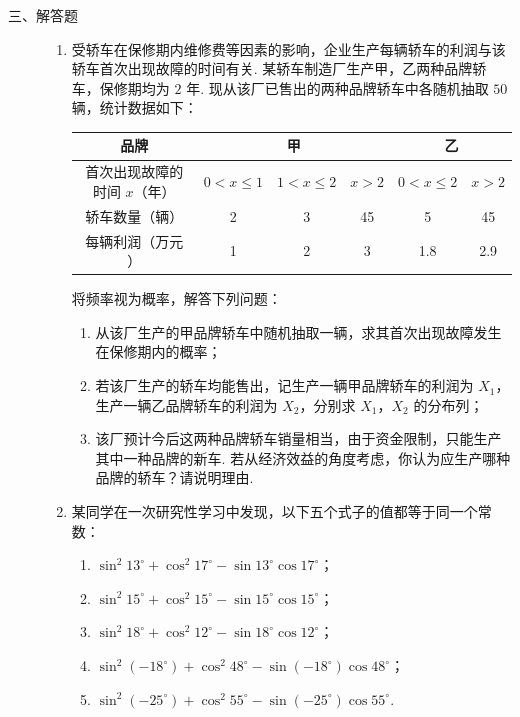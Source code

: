 \begin{description}

    \item[三、解答题]

    \begin{enumerate}[leftmargin=5pt]

      \addtocounter{enumi}{+15}

        \item 受轿车在保修期内维修费等因素的影响，企业生产每辆轿车的利润与该轿车首次出现故障的时间有关. 某轿车制造厂生产甲，乙两种品牌轿车，保修期均为 \(2\) 年. 现从该厂已售出的两种品牌轿车中各随机抽取 \(50\) 辆，统计数据如下：

\begin{center}
\renewcommand{\arraystretch}{1.2}
\begin{tabular}{|c|c|c|c|c|c|}
\hline
品牌 & \multicolumn{3}{c|}{甲} & \multicolumn{2}{c|}{乙} \\
\hline
首次出现故障的时间 \(x\)（\(\text{年}\)） & \(0 < x \leqslant 1\) & \(1 < x \leqslant 2\) & \(x > 2\) & \(0 < x \leqslant 2\) & \(x > 2\) \\
\hline
轿车数量（\(\text{辆}\)） & 2 & 3 & 45 & 5 & 45 \\
\hline
每辆利润（\(\text{万元}\)） & 1 & 2 & 3 & 1.8 & 2.9 \\
\hline
\end{tabular}
\end{center}

将频率视为概率，解答下列问题：

\begin{enumerate}
\item 从该厂生产的甲品牌轿车中随机抽取一辆，求其首次出现故障发生在保修期内的概率；
\item 若该厂生产的轿车均能售出，记生产一辆甲品牌轿车的利润为 \(X_{1}\)，生产一辆乙品牌轿车的利润为 \(X_{2}\)，分别求 \(X_{1}\)，\(X_{2}\) 的分布列；
\item 该厂预计今后这两种品牌轿车销量相当，由于资金限制，只能生产其中一种品牌的新车. 若从经济效益的角度考虑，你认为应生产哪种品牌的轿车？请说明理由.
\end{enumerate}

        \item 某同学在一次研究性学习中发现，以下五个式子的值都等于同一个常数：

\begin{enumerate}
\item \(\sin^{2}13^{\circ} + \cos^{2}17^{\circ} - \sin13^{\circ}\cos17^{\circ}\)；
\item \(\sin^{2}15^{\circ} + \cos^{2}15^{\circ} - \sin15^{\circ}\cos15^{\circ}\)；
\item \(\sin^{2}18^{\circ} + \cos^{2}12^{\circ} - \sin18^{\circ}\cos12^{\circ}\)；
\item \(\sin^{2}(-18^{\circ}) + \cos^{2}48^{\circ} - \sin(-18^{\circ})\cos48^{\circ}\)；
\item \(\sin^{2}(-25^{\circ}) + \cos^{2}55^{\circ} - \sin(-25^{\circ})\cos55^{\circ}\).
\end{enumerate}


\end{enumerate}
\end{description}
